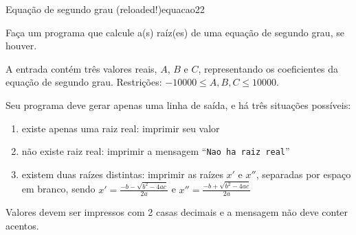 \documentclass[12pt,a4paper,oneside]{article}
\begin{document}
\begin{problem}{Equação de segundo grau (reloaded!)}{equacao2}{2}
 
Faça um programa que calcule a(s) raíz(es) de uma equação de segundo grau, se houver.
%

\InputFile

A entrada contém três valores reais, $A$, $B$ e $C$, representando os coeficientes da equação de segundo grau. Restrições: $-10000 \leq A,B,C \leq 10000$.



\OutputFile

Seu programa deve gerar apenas uma linha de saída, e há três situações possíveis:

\begin{enumerate}
    \item existe apenas uma raiz real: imprimir seu valor
    \item não existe raiz real: imprimir a mensagem ``\texttt{Nao ha raiz real}''
    \item existem duas raízes distintas: imprimir as raízes $x'$ e $x''$, separadas por espaço em branco, sendo $x' = \frac{-b-\sqrt{b^2 -4ac}}{2a}$ e $x'' = \frac{-b+\sqrt{b^2 -4ac}}{2a}$
\end{enumerate}

Valores devem ser impressos com 2 casas decimais e a mensagem não deve conter acentos.


\Example

\begin{example}
%
\end{example}

\begin{example}
%
\end{example}

\begin{example}
%
\end{example}



\end{problem}
\end{document}
